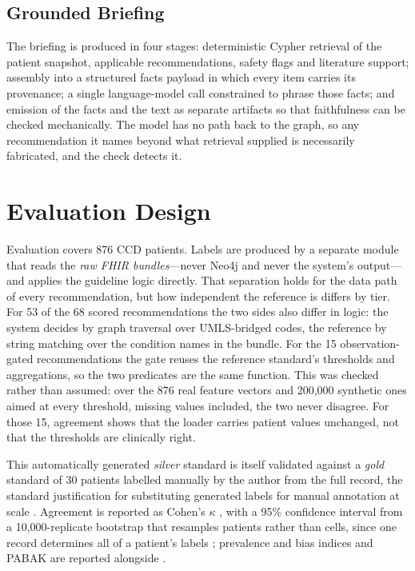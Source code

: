 \documentclass[conference]{IEEEtran}
\begin{document}
\subsection{Grounded Briefing}
The briefing is produced in four stages: deterministic Cypher retrieval of the patient
snapshot, applicable recommendations, safety flags and literature support; assembly into a
structured facts payload in which every item carries its provenance; a single
language-model call constrained to phrase those facts; and emission of the facts and the
text as separate artifacts so that faithfulness can be checked mechanically. The model has
no path back to the graph, so any recommendation it names beyond what retrieval supplied is
necessarily fabricated, and the check detects it.

\section{Evaluation Design}
\label{sec:eval}

Evaluation covers 876 CCD patients. Labels are produced by a separate module that reads the
\emph{raw FHIR bundles}---never Neo4j and never the system's output---and applies the
guideline logic directly. That separation holds for the data path of every recommendation,
but how independent the reference is differs by tier. For 53 of the 68 scored
recommendations the two sides also differ in logic: the system decides by graph traversal
over UMLS-bridged codes, the reference by string matching over the condition names in the
bundle. For the 15 observation-gated recommendations the gate reuses the reference
standard's thresholds and aggregations, so the two predicates are the same function. This
was checked rather than assumed: over the 876 real feature vectors and 200,000 synthetic ones
aimed at every threshold, missing values included, the two never disagree. For those 15,
agreement shows that the loader carries patient values unchanged, not that the thresholds
are clinically right.

This automatically generated \emph{silver} standard is itself validated against a
\emph{gold} standard of 30 patients labelled manually by the author from the full record,
the standard justification for substituting generated labels for manual annotation at
scale \cite{rebholz2011,nogues2022}. Agreement is reported as Cohen's $\kappa$
\cite{cohen1960}, with a 95\% confidence interval from a 10,000-replicate bootstrap
\cite{efron1994} that resamples patients rather than cells, since one record determines
all of a patient's labels \cite{field2007}; prevalence and bias indices and PABAK are
reported alongside \cite{byrt1993}.
\end{document}
